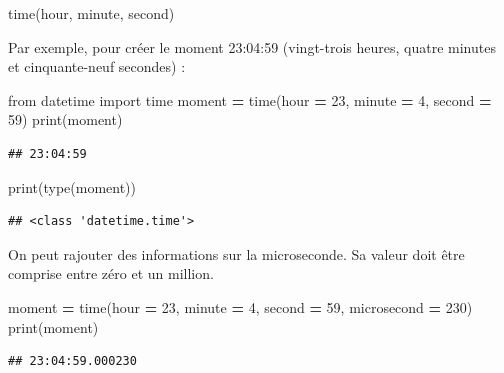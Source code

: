 \documentclass[12pt,]{book}
\newenvironment{Shaded}{\begin{snugshade}}{\end{snugshade}}
\newcommand{\DecValTok}[1]{\textcolor[rgb]{0.00,0.00,0.81}{#1}}
\newcommand{\ImportTok}[1]{#1}
\newcommand{\OperatorTok}[1]{\textcolor[rgb]{0.81,0.36,0.00}{\textbf{#1}}}
\newcommand{\BuiltInTok}[1]{#1}
\newcommand{\NormalTok}[1]{#1}
\numberwithin{equation}{section}
\numberwithin{countremarque}{section}
\begin{document}
\begin{Shaded}
\begin{Highlighting}[]
\NormalTok{time(hour, minute, second)}
\end{Highlighting}
\end{Shaded}

Par exemple, pour créer le moment 23:04:59 (vingt-trois heures, quatre
minutes et cinquante-neuf secondes) :

\begin{Shaded}
\begin{Highlighting}[]
\ImportTok{from}\NormalTok{ datetime }\ImportTok{import}\NormalTok{ time}
\NormalTok{moment }\OperatorTok{=}\NormalTok{ time(hour }\OperatorTok{=} \DecValTok{23}\NormalTok{, minute }\OperatorTok{=} \DecValTok{4}\NormalTok{, second }\OperatorTok{=} \DecValTok{59}\NormalTok{)}
\BuiltInTok{print}\NormalTok{(moment)}
\end{Highlighting}
\end{Shaded}

\begin{lstlisting}
## 23:04:59
\end{lstlisting}

\begin{Shaded}
\begin{Highlighting}[]
\BuiltInTok{print}\NormalTok{(}\BuiltInTok{type}\NormalTok{(moment))}
\end{Highlighting}
\end{Shaded}

\begin{lstlisting}
## <class 'datetime.time'>
\end{lstlisting}

On peut rajouter des informations sur la microseconde. Sa valeur doit
être comprise entre zéro et un million.

\begin{Shaded}
\begin{Highlighting}[]
\NormalTok{moment }\OperatorTok{=}\NormalTok{ time(hour }\OperatorTok{=} \DecValTok{23}\NormalTok{, minute }\OperatorTok{=} \DecValTok{4}\NormalTok{, second }\OperatorTok{=} \DecValTok{59}\NormalTok{, microsecond }\OperatorTok{=} \DecValTok{230}\NormalTok{)}
\BuiltInTok{print}\NormalTok{(moment)}
\end{Highlighting}
\end{Shaded}

\begin{lstlisting}
## 23:04:59.000230
\end{lstlisting}
\end{document}
